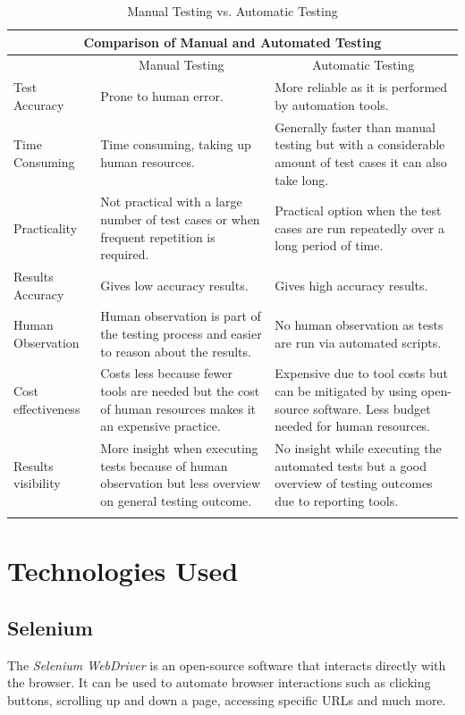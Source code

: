 \begin{center}
\begin{longtable}{ |p{3.7cm}|p{4.6cm}|p{4.6cm}| }
 \hline
 	\multicolumn{3}{|c|}{Comparison of Manual and Automated Testing} \\
 \hline
 	& \multicolumn{1}{|c|}{Manual Testing} & \multicolumn{1}{|c|}{Automatic Testing} \\
 \hline
 	Test Accuracy & Prone to human error. & More reliable as it is performed by automation tools.\\
 \hline
    Time Consuming & Time consuming, taking up human resources. & Generally faster than manual testing but with a considerable amount of test cases it can also take long.\\
 \hline
    Practicality & Not practical with a large number of test cases or when frequent repetition is required. & Practical option when the test cases are run repeatedly over a long period of time.\\
 \hline
    Results Accuracy & Gives low accuracy results. & Gives high accuracy results.\\
 \hline
    Human Observation & Human observation is part of the testing process and easier to reason about the results. & No human observation as tests are run via automated scripts.\\
 \hline
    Cost effectiveness & Costs less because fewer tools are needed but the cost of human resources makes it an expensive practice. & Expensive due to tool costs but can be mitigated by using open-source software. Less budget needed for human resources.\\
 \hline
    Results visibility & More insight when executing tests because of human observation but less overview on general testing outcome. & No insight while executing the automated tests but a good overview of testing outcomes due to reporting tools.\\
 \hline
 \caption{Manual Testing vs. Automatic Testing}
 \label{tab:manual-vs-automatic}
\end{longtable}
\end{center}

\vspace{-1.5cm}

\section{Technologies Used}
\label{sec:technologies-used}

\subsection{Selenium}
\label{subsec:selenium}
The \textit{Selenium WebDriver} is an open-source software that interacts directly with the browser. It can be used to automate browser interactions such as clicking buttons, scrolling up and down a page, accessing specific URLs and much more.
\\

